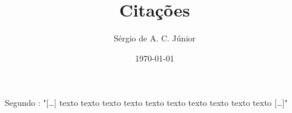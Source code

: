 \documentclass[a4paper, 12 pt]{article}
\begin{document}
    \title{\Large{\textbf{Citações}}}
    \author{Sérgio de A. C. Júnior}
    \date{\today}

    \maketitle

    Segundo : "[\ldots] texto texto texto texto texto texto texto texto texto texto [\ldots]"
\end{document}
